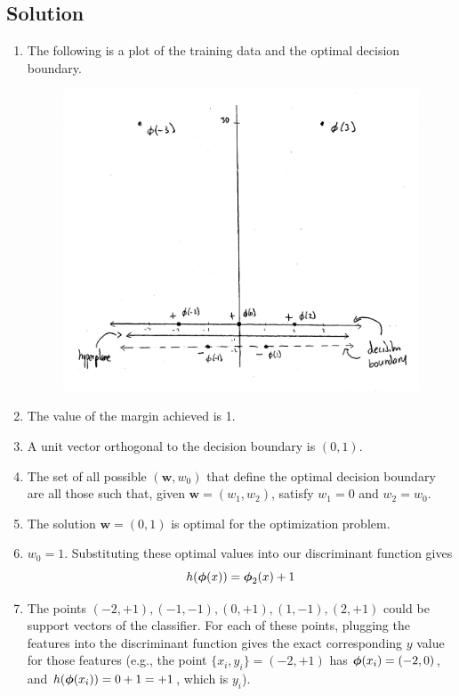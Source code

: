 \documentclass[submit]{harvardml}
\begin{document}
\subsection*{Solution}
\begin{enumerate}

\item
The following is a plot of the training data and the optimal decision boundary.

\begin{figure}[h]
\includegraphics[width=\linewidth]{Cs181hw4.jpg}
\end{figure}

\item 
The value of the margin achieved is 1.

\item 
A unit vector orthogonal to the decision boundary is $(0, 1)$.

\item 
The set of all possible $(\mathbf{w}, w_0)$ that define the optimal decision boundary
are all those such that, given $\mathbf{w}=(w_1, w_2)$, satisfy $w_1 = 0$ and $w_2=w_0$.

\item 
The solution $\mathbf{w} = (0, 1)$ is optimal for the optimization problem.

\item
$w_0 = 1$. Substituting these optimal values into our discriminant function gives
$$h(\boldsymbol{\phi}(x))= \boldsymbol{\phi}_2(x) + 1$$

\item 
The points $(-2,+1),(-1,-1),(0,+1),(1,-1),(2,+1)$ could be support vectors of the classifier. For each of these
points, plugging the features into the discriminant function gives the exact corresponding
$y$ value for those features (e.g., the point $\{x_i, y_i\} = (-2, +1)$ has $\boldsymbol{\phi}(x_i)=(-2, 0)$, and 
$h(\boldsymbol{\phi}(x_i))= 0 + 1 = +1$, which is $y_i$).


\end{enumerate}
\end{document}
